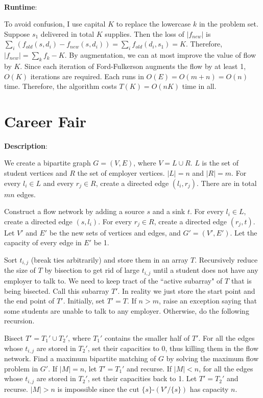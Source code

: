 \documentclass{article}
\begin{document}
~

\noindent\textbf{Runtime}:

To avoid confusion, I use capital $K$ to replace the lowercase $k$ in the problem set. Suppose $s_1$ delivered in total $K$ supplies. Then the loss of $|f_{new}|$ is $\sum_i(f_{old}(s,d_i)-f_{new}(s,d_i))=\sum_if_{old}(d_i,s_1)=K$. Therefore, $|f_{new}|=\sum_kf_k-K$. By augmentation, we can at most improve the value of flow by $K$. Since each iteration of Ford-Fulkerson augments the flow by at least 1, $O(K)$ iterations are required. Each runs in $O(E)=O(m+n)=O(n)$ time. Therefore, the algorithm costs $T(K)=O(nK)$ time in all.


\section{Career Fair}
\noindent\textbf{Description}:

We create a bipartite graph $G=(V,E)$, where $V=L\cup R$. $L$ is the set of student vertices and $R$ the set of employer vertices. $|L|=n$ and $|R|=m$. For every $l_i\in L$ and every $r_j\in R$, create a directed edge $(l_i,r_j)$. There are in total $mn$ edges.

Construct a flow network by adding a source $s$ and a sink $t$. For every $l_i\in L$, create a directed edge $(s,l_i)$. For every $r_j\in R$, create a directed edge $(r_j,t)$. Let $V'$ and $E'$ be the new sets of vertices and edges, and $G'=(V',E')$. Let the capacity of every edge in $E'$ be 1.

Sort $t_{i,j}$ (break ties arbitrarily) and store them in an array $T$. Recursively reduce the size of $T$ by bisection to get rid of large $t_{i,j}$ until a student does not have any employer to talk to. We need to keep tract of the ``active subarray" of $T$ that is being bisected. Call this subarray $T'$. In reality we just store the start point and the end point of $T'$. Initially, set $T'=T$. If $n>m$, raise an exception saying that some students are unable to talk to any employer. Otherwise, do the following recursion.

Bisect $T'=T_1'\cup T_2'$, where $T_1'$ contains the smaller half of $T'$. For all the edges whose $t_{i,j}$ are stored in $T_2'$, set their capacities to 0, thus killing them in the flow network. Find a maximum bipartite matching of $G$ by solving the maximum flow problem in $G'$. If $|M|=n$, let $T'=T_1'$ and recurse. If $|M|<n$, for all the edges whose $t_{i,j}$ are stored in $T_2'$, set their capacities back to 1. Let $T'=T_2'$ and recurse. $|M|>n$ is impossible since the cut $\{s\}$-$(V'/\{s\})$ has capacity $n$.
\end{document}
